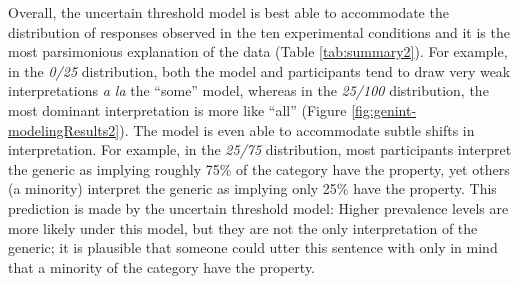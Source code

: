 \documentclass[floatsintext,doc]{apa6}
\begin{document}
Overall, the uncertain threshold model is best able to accommodate the distribution of responses observed in the ten experimental conditions and it is the most parsimonious explanation of the data (Table \ref{tab:summary2}). 
For example, in the \emph{0/25} distribution, both the model and participants tend to draw very weak interpretations \emph{a la} the ``some'' model, whereas in the \emph{25/100} distribution, the most dominant interpretation is more like ``all'' (Figure \ref{fig:genint-modelingResults2}).
The model is even able to accommodate subtle shifts in interpretation.
For example, in the \emph{25/75} distribution, most participants interpret  the generic as implying roughly 75\% of the category have the property, yet others (a minority) interpret the generic as implying only 25\% have the property. This prediction is made by the uncertain threshold model: Higher prevalence levels are more likely under this model, but they are not the only interpretation of the generic; it is plausible that someone could utter this sentence with only in mind that a minority of the category have the property. 

\end{document}
